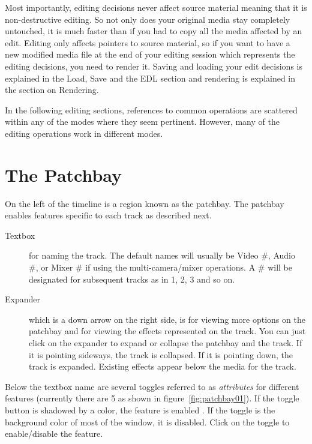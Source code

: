 Most importantly, editing decisions never affect source material meaning that it is non-destructive editing.  So not only does your original media stay completely untouched, it is much faster than if you had to copy all the media affected by an edit.  Editing only affects pointers to source material, so if you want to have a new modified media file at the end of your editing session which represents the editing decisions, you need to render it.  Saving and loading your edit decisions is explained in the Load, Save and the EDL section and rendering is explained in the section on Rendering.

In the following editing sections, references to common operations are scattered within any of the modes where they seem pertinent.  However, many of the editing operations work in different modes.

\section{The Patchbay}%
\label{sec:patchbay}

On the left of the timeline is a region known as the patchbay.  The patchbay enables features specific to each track as described next.

\begin{description}
    \item[Textbox] for naming the track.  The default names will usually be Video \#, Audio \#, or Mixer \# if using the multi-camera/mixer operations.  A \# will be designated for subsequent tracks as in 1, 2, 3 and so on.
    \item[Expander] which is a down arrow on the right side, is for viewing more options on the patchbay and for viewing the effects represented on the track.   You can just click on the expander to expand or collapse the patchbay and the track.  If it is pointing sideways, the track is collapsed.  If it is pointing down, the track is expanded.  Existing effects appear below the media for the track.
\end{description}

\noindent Below the textbox name are several toggles referred to as \textit{attributes} for different features (currently there are 5 as shown in figure~\ref{fig:patchbay01}).  If the toggle button is shadowed by a color, the feature is enabled . If the toggle is the background color of most of the window, it is disabled. Click 
on the toggle to enable/disable the feature.

